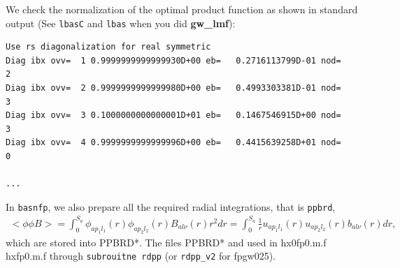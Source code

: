\documentclass[a4paper,10pt,epsf,fleqn]{article}
\begin{document}
We check the normalization of the optimal product function
as shown in standard output 
(See \verb|lbasC| and \verb|lbas| when you did {\bf gw\_lmf}):

{\baselineskip=4mm
\begin{verbatim}
Use rs diagonalization for real symmetric 
Diag ibx ovv=  1 0.9999999999999930D+00 eb=   0.2716113799D-01 nod=   2
Diag ibx ovv=  2 0.9999999999999980D+00 eb=   0.4993303381D-01 nod=   3
Diag ibx ovv=  3 0.1000000000000001D+01 eb=   0.1467546915D+00 nod=   3
Diag ibx ovv=  4 0.9999999999999996D+00 eb=   0.4415639258D+01 nod=   0

...
\end{verbatim}
}

In \verb|basnfp|, we also prepare all the required 
radial integrations, that is \verb|ppbrd|,
\begin{eqnarray}
   <\phi \phi B> = \int_0^{S_a}
   \phi_{ap_1 l_1}(r) \phi_{ap_2 l_2}(r) B_{al\nu}(r) r^2 dr
   = \int_0^{S_a} \frac{1}{r}
     u_{ap_1l_1}(r) u_{ap_2l_2}(r) b_{al\nu}(r) dr,
\end{eqnarray}
which are stored into {\sf PPBRD*}.  The files {\sf PPBRD*} and used 
in {\sf hx0fp0.m.f hxfp0.m.f} through \verb#subrouitne rdpp# 
(or \verb#rdpp_v2# for fpgw025).


%
\end{document}
